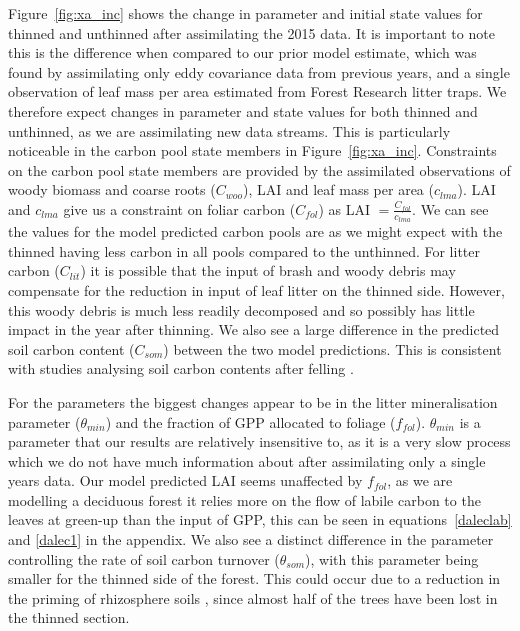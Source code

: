 \documentclass[12pt]{article}
\begin{document}
Figure~\ref{fig:xa_inc} shows the change in parameter and initial state values for thinned and unthinned after assimilating the 2015 data. It is important to note this is the difference when compared to our prior model estimate, which was found by assimilating only eddy covariance data from previous years, and a single observation of leaf mass per area estimated from Forest Research litter traps. We therefore expect changes in parameter and state values for both thinned and unthinned, as we are assimilating new data streams. This is particularly noticeable in the carbon pool state members in Figure~\ref{fig:xa_inc}. Constraints on the carbon pool state members are provided by the assimilated observations of woody biomass and coarse roots (\(C_{woo}\)), LAI and leaf mass per area (\(c_{lma}\)). LAI and \(c_{lma}\) give us a constraint on foliar carbon (\(C_{fol}\)) as LAI \(= \frac{C_{fol}}{c_{lma}} \). We can see the values for the model predicted carbon pools are as we might expect with the thinned having less carbon in all pools compared to the unthinned. For litter carbon (\(C_{lit}\)) it is possible that the input of brash and woody debris may compensate for the reduction in input of leaf litter on the thinned side. However, this woody debris is much less readily decomposed and so possibly has little impact in the year after thinning. We also see a large difference in the predicted soil carbon content (\(C_{som}\)) between the two model predictions. This is consistent with studies analysing soil carbon contents after felling \citep{Hernesmaa2005777}. 

For the parameters the biggest changes appear to be in the litter mineralisation parameter (\(\theta_{min}\)) and the fraction of GPP allocated to foliage (\(f_{fol}\)). \(\theta_{min}\) is a parameter that our results are relatively insensitive to, as it is a very slow process which we do not have much information about after assimilating only a single years data. Our model predicted LAI seems unaffected by \(f_{fol}\), as we are modelling a deciduous forest it relies more on the flow of labile carbon to the leaves at green-up than the input of GPP, this can be seen in equations~\eqref{daleclab} and \eqref{dalec1} in the appendix. We also see a distinct difference in the parameter controlling the rate of soil carbon turnover (\(\theta_{som}\)), with this parameter being smaller for the thinned side of the forest. This could occur due to a reduction in the priming of rhizosphere soils \citep{ELE:ELE1095}, since almost half of the trees have been lost in the thinned section.
\end{document}
